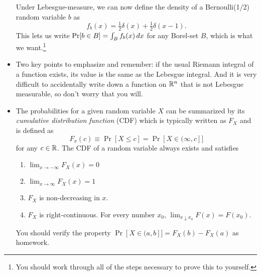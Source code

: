 \begin{itemize}[leftmargin=0pt]
  Under Lebesgue-measure, we can now define the density of a
  Bernoulli(1/2) random variable $b$ as
  \begin{equation*}
    f_b(x) = \tfrac{1}{2} \delta(x) + \tfrac{1}{2} \delta(x - 1).
  \end{equation*}
  This lets us write $\operatorname{Pr}[b \in B] = \int_B f_b(x) \,dx$ for any Borel-set
  $B$, which is what we want.\footnote{You should work through all of
  the steps necessary to prove this to yourself.}

\item Two key points to emphasize and remember: if the usual Riemann
  integral of a function exists, its value is the same as the Lebesgue
  integral. And it is very difficult to accidentally write down a
  function on $\mathbb{R}^n$ that is not Lebesgue measurable, so don't worry
  that you will.

\item The probabilities for a given random variable $X$ can be
  summarized by its \emph{cumulative distribution function} (CDF)
  which is typically written as $F_X$ and is defined as
  \begin{equation*}
    F_x(c) \equiv \Pr[X \leq c] = \Pr[X \in (\infty, c]]
  \end{equation*}
  for any $c \in \mathbb{R}$.  The CDF of a random variable always exists and
  satisfies
  \begin{enumerate}
  \item $\lim_{x \to -\infty} F_X(x) = 0$
  \item $\lim_{x \to \infty} F_X(x) = 1$
  \item $F_X$ is non-decreasing in $x$.
  \item $F_X$ is right-continuous.  For every number $x_0$,
    $\lim_{x \downarrow x_0} F(x) = F(x_0)$.
  \end{enumerate}

  You should verify the property $\Pr[X \in (a, b]] = F_X(b) - F_X(a)$
  as homework.


\end{itemize}
